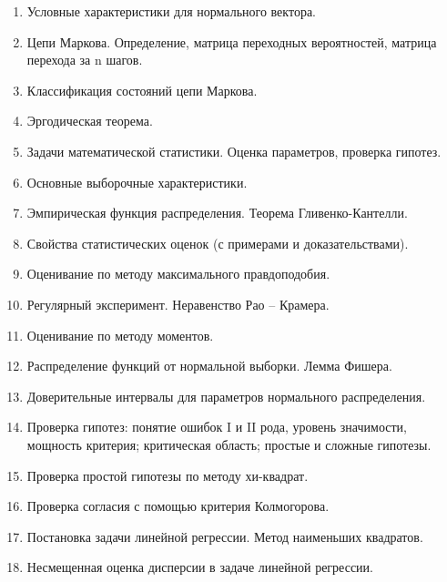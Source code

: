 \documentclass[14pt]{extarticle}
\theoremstyle{breakstyle}
\begin{document}
\begin{enumerate}
    \item Условные характеристики для нормального вектора.
    \item Цепи Маркова. Определение, матрица переходных вероятностей, матрица перехода за n шагов.
    \item Классификация состояний цепи Маркова.
    \item Эргодическая теорема.
    \item Задачи математической статистики. Оценка параметров, проверка гипотез.
    \item Основные выборочные характеристики.
    \item Эмпирическая функция распределения. Теорема Гливенко-Кантелли.
    \item Свойства статистических оценок (с примерами и доказательствами).
    \item Оценивание по методу максимального правдоподобия.
    \item Регулярный эксперимент. Неравенство Рао – Крамера.
    \item Оценивание по методу моментов.
    \item Распределение функций от нормальной выборки. Лемма Фишера.
    \item Доверительные интервалы для параметров нормального распределения.
    \item Проверка гипотез: понятие ошибок I и II рода, уровень значимости, мощность критерия; критическая область; простые и сложные гипотезы.
    \item Проверка простой гипотезы по методу хи-квадрат.
    \item Проверка согласия с помощью критерия Колмогорова.
    \item Постановка задачи линейной регрессии. Метод наименьших квадратов.
    \item Несмещенная оценка дисперсии в задаче линейной регрессии.
\end{enumerate}
\end{document}
